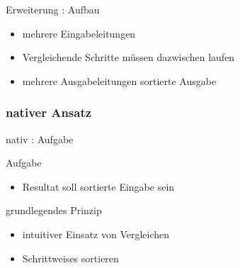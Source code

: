 \documentclass[ucs,9pt]{beamer}
\begin{document}
\begin{frame}{Erweiterung : Aufbau}
    \begin{itemize}
        \item mehrere Eingabeleitungen
        \item Vergleichende Schritte müssen dazwischen laufen
        \item mehrere Ausgabeleitungen sortierte Ausgabe
    \end{itemize}
\end{frame}

\subsubsection*{nativer Ansatz}
\begin{frame}{nativ : Aufgabe}
\begin{semiverbatim}
     {Aufgabe
        \begin{itemize}
            \item Resultat soll sortierte Eingabe sein
            \end{itemize}}
     {\item grundlegendes Prinzip
        \begin{itemize}
            \item intuitiver Einsatz von Vergleichen
            \item Schrittweises sortieren
        \end{itemize}}
\end{semiverbatim}
\end{frame}
\end{document}
